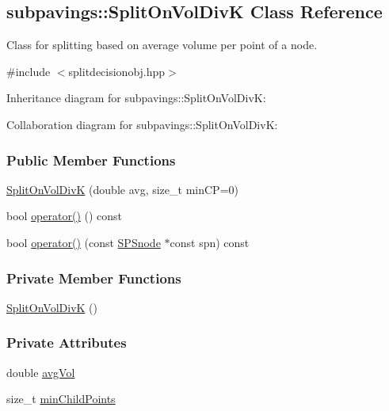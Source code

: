 \hypertarget{classsubpavings_1_1SplitOnVolDivK}{\subsection{subpavings\-:\-:\-Split\-On\-Vol\-Div\-K \-Class \-Reference}
\label{classsubpavings_1_1SplitOnVolDivK}
}


\-Class for splitting based on average volume per point of a node.  




{\ttfamily \#include $<$splitdecisionobj.\-hpp$>$}



\-Inheritance diagram for subpavings\-:\-:\-Split\-On\-Vol\-Div\-K\-:


\-Collaboration diagram for subpavings\-:\-:\-Split\-On\-Vol\-Div\-K\-:
\subsubsection*{\-Public \-Member \-Functions}
\begin{DoxyCompactItemize}
\item 
\hyperlink{classsubpavings_1_1SplitOnVolDivK_abed4ce733108184705ce47726f635a07}{\-Split\-On\-Vol\-Div\-K} (double avg, size\-\_\-t min\-C\-P=0)
\item 
bool \hyperlink{classsubpavings_1_1SplitOnVolDivK_a8130f8e0a079a6fe864cf4f4704f85b6}{operator()} () const 
\item 
bool \hyperlink{classsubpavings_1_1SplitOnVolDivK_a63d0800fecf56e5b7cd4a90212766329}{operator()} (const \hyperlink{classsubpavings_1_1SPSnode}{\-S\-P\-Snode} $\ast$const spn) const 
\end{DoxyCompactItemize}
\subsubsection*{\-Private \-Member \-Functions}
\begin{DoxyCompactItemize}
\item 
\hyperlink{classsubpavings_1_1SplitOnVolDivK_a705d6f5f7dc1df471bf665d1a53dd90f}{\-Split\-On\-Vol\-Div\-K} ()
\end{DoxyCompactItemize}
\subsubsection*{\-Private \-Attributes}
\begin{DoxyCompactItemize}
\item 
double \hyperlink{classsubpavings_1_1SplitOnVolDivK_af1cbe104ee3bc6fd3598c511be389d85}{avg\-Vol}
\item 
size\-\_\-t \hyperlink{classsubpavings_1_1SplitOnVolDivK_aa85a2b8c26238dc21866b947f1142d77}{min\-Child\-Points}
\end{DoxyCompactItemize}


